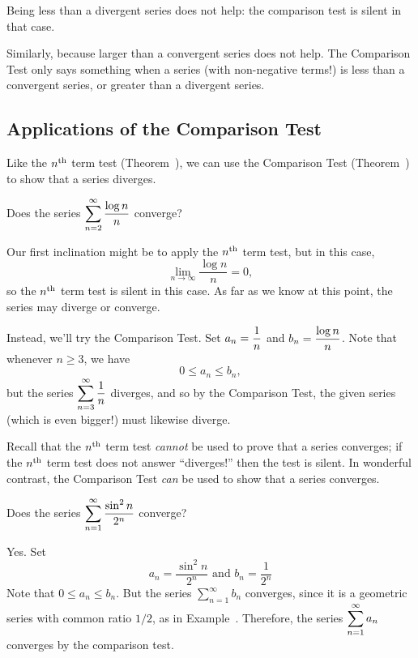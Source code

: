 \begin{warning}
  Being less than a divergent series does not help: the comparison
  test is silent in that case.

  Similarly, because larger than a convergent series does not help.
  The Comparison Test only says something when a series (with non-negative terms!) is less than a
  convergent series, or greater than a divergent series.
\end{warning}

\subsection{Applications of the Comparison Test}

Like the $n^{\mbox{\scriptsize th}}$ term test (Theorem~), we
can use the Comparison Test (Theorem~) to
show that a series diverges.

\begin{example}
Does the series $\displaystyle\sum_{n=2}^\infty \displaystyle\frac{\log n}{n}$ converge?
\end{example}

\begin{example}
Our first inclination might be to apply the $n^{\mbox{\scriptsize th}}$ term test, but in this case,
$$
\lim_{n \to \infty} \frac{\log n}{n} = 0,
$$
so the $n^{\mbox{\scriptsize th}}$ term test is silent in this case.  As far as we know
at this point, the series may diverge or converge.

Instead, we'll try the Comparison Test.  Set $a_n = \displaystyle\frac{1}{n}$ and $b_n = \displaystyle\frac{\log n}{n}$.  Note that whenever $n \geq 3$, we have
$$
0 \leq a_n \leq b_n,
$$
but the series $\displaystyle\sum_{n=3}^\infty \frac{1}{n}$ diverges, and so by
the Comparison Test, the given series (which is even bigger!) must
likewise diverge.
\end{example}

Recall that the $n^{\mbox{\scriptsize th}}$ term test \textit{cannot} be used to prove that a series converges; if the $n^{\mbox{\scriptsize th}}$ term test does not answer ``diverges!'' then the test is silent.  In wonderful contrast, the Comparison Test \textit{can} be used to show that a series converges.

\begin{example}
Does the series $\displaystyle\sum_{n=1}^\infty \displaystyle\frac{\sin^2 n}{2^n}$ converge?
\end{example}

\begin{example}
Yes.  Set
$$
a_n = \frac{\sin^2 n}{2^n} \mbox{ and } b_n = \frac{1}{2^n}
$$
Note that $0 \leq a_n \leq b_n$.  But the series $\sum_{n=1}^\infty
b_n$ converges, since it is a geometric series with common ratio
$1/2$, as in Example~.  Therefore,
the series $\displaystyle\sum_{n=1}^\infty a_n$ converges by the comparison
test.
\end{example}

